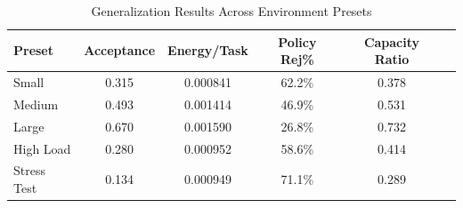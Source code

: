 \begin{table}[h]
\centering
\caption{Generalization Results Across Environment Presets}
\label{tab:generalization}
\begin{tabular}{lccccc}
\toprule
Preset & Acceptance & Energy/Task & Policy Rej\% & Capacity Ratio \\
\midrule
Small & 0.315 & 0.000841 & 62.2\% & 0.378 \\
Medium & 0.493 & 0.001414 & 46.9\% & 0.531 \\
Large & 0.670 & 0.001590 & 26.8\% & 0.732 \\
High Load & 0.280 & 0.000952 & 58.6\% & 0.414 \\
Stress Test & 0.134 & 0.000949 & 71.1\% & 0.289 \\
\bottomrule
\end{tabular}
\end{table}
